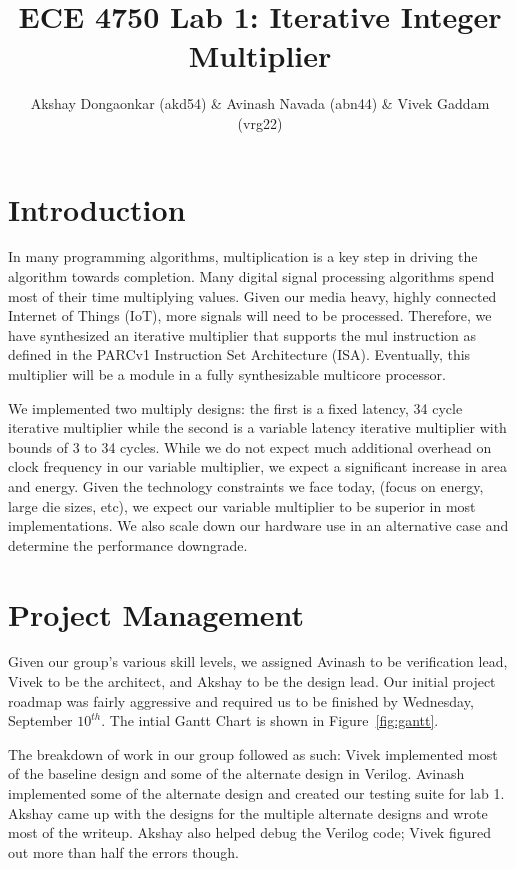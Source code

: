 \documentclass[11pt]{article}
\begin{document}
\title{ECE 4750 Lab 1: Iterative Integer Multiplier}
\author{Akshay Dongaonkar (akd54) \& Avinash Navada (abn44) \& Vivek Gaddam (vrg22)}
\maketitle

\section{Introduction}

In many programming algorithms, multiplication is a key step in driving the algorithm towards completion. 
Many digital signal processing algorithms spend most of their time multiplying values. 
Given our media heavy, highly connected Internet of Things (IoT), more signals will need to be processed.
Therefore, we have synthesized an iterative multiplier that supports the mul instruction as defined in the PARCv1 Instruction Set Architecture (ISA).
Eventually, this multiplier will be a module in a fully synthesizable multicore processor.

We implemented two multiply designs: the first is a fixed latency, 34 cycle iterative multiplier while the second is a variable latency
iterative multiplier with bounds of 3 to 34 cycles.
While we do not expect much additional overhead on clock frequency in our variable multiplier,
we expect a significant increase in area and energy.
Given the technology constraints we face today, (focus on energy, large die sizes, etc),
we expect our variable multiplier to be superior in most implementations.
We also scale down our hardware use in an alternative case and determine the performance downgrade.  


\section{Project Management}

Given our group's various skill levels, we assigned Avinash to be verification lead, Vivek to be the architect, and Akshay to be the design lead.
Our initial project roadmap was fairly aggressive and required us to be finished by Wednesday, September $10^{th}$.
The intial Gantt Chart is shown in Figure~\ref{fig:gantt}.

The breakdown of work in our group followed as such:
Vivek implemented most of the baseline design and some of the alternate design in Verilog. 
Avinash implemented some of the alternate design and created our testing suite for lab 1.
Akshay came up with the designs for the multiple alternate designs and wrote most of the writeup.
Akshay also helped debug the Verilog code; Vivek figured out more than half the errors though.
\end{document}
